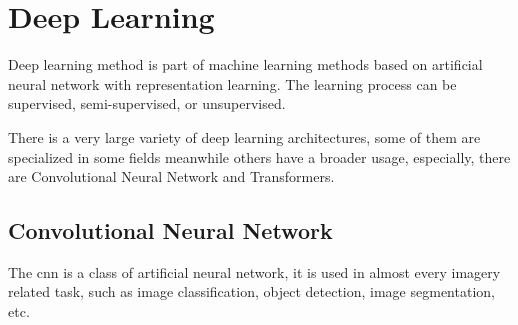 \section{Deep Learning}\label{sec:deep-learning}

Deep learning method is part of machine learning methods based on artificial neural network with representation learning.
The learning process can be supervised, semi-supervised, or unsupervised.

There is a very large variety of deep learning architectures, some of them are specialized in some fields meanwhile others have a broader usage, especially, there are Convolutional Neural Network and Transformers.

\subsection{Convolutional Neural Network}\label{subsec:conv-neural-network}
The \gls{cnn} is a class of artificial neural network, it is used in almost every imagery related task, such as image classification, object detection, image segmentation, etc.

